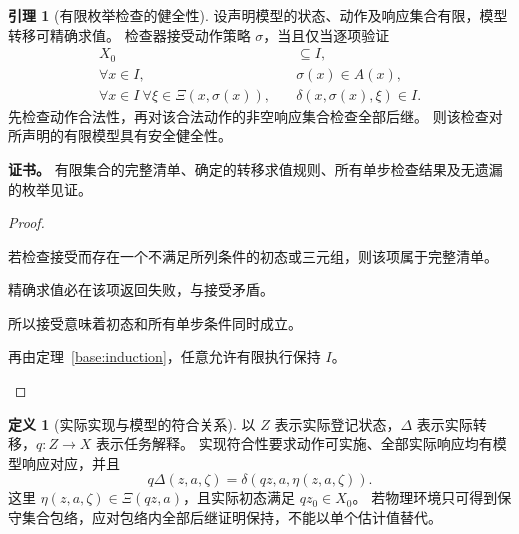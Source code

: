 \documentclass[UTF8,12pt,a4paper,openany,fontset=none,zihao=false]{ctexrep}
\theoremstyle{definition}
\newtheorem{definition}{定义}[chapter]
\newtheorem{lemma}{引理}[chapter]
\newenvironment{certificate}{\par\noindent\textbf{证书。}\ignorespaces}{\par}
\newcommand{\1}{\mathbf 1}
\begin{document}
\begin{lemma}[有限枚举检查的健全性]
\label{tra:finite-check}
设声明模型的状态、动作及响应集合有限，模型转移可精确求值。
检查器接受动作策略 \(\sigma\)，当且仅当逐项验证
\[
\begin{aligned}
X_0&\subseteq I,\\
\forall x\in I,\quad &\sigma(x)\in A(x),\\
\forall x\in I\ \forall\xi\in\Xi(x,\sigma(x)),\quad
&\delta(x,\sigma(x),\xi)\in I.
\end{aligned}
\]
先检查动作合法性，再对该合法动作的非空响应集合检查全部后继。
则该检查对所声明的有限模型具有安全健全性。
\end{lemma}
\begin{certificate}
有限集合的完整清单、确定的转移求值规则、所有单步检查结果及无遗漏的枚举见证。
\end{certificate}
\begin{proof}
\begin{semanticsteps}
\item 若检查接受而存在一个不满足所列条件的初态或三元组，则该项属于完整清单。
\item 精确求值必在该项返回失败，与接受矛盾。
\item 所以接受意味着初态和所有单步条件同时成立。
\item 再由定理~\ref{base:induction}，任意允许有限执行保持 \(I\)。
\end{semanticsteps}
\end{proof}

\begin{definition}[实际实现与模型的符合关系]
\label{tra:realization}
以 \(Z\) 表示实际登记状态，\(\Delta\) 表示实际转移，\(q:Z\to X\) 表示任务解释。
实现符合性要求动作可实施、全部实际响应均有模型响应对应，并且
\[
q\Delta(z,a,\zeta)=\delta(qz,a,\eta(z,a,\zeta)).
\]
这里 \(\eta(z,a,\zeta)\in\Xi(qz,a)\)，且实际初态满足 \(qz_0\in X_0\)。
若物理环境只可得到保守集合包络，应对包络内全部后继证明保持，不能以单个估计值替代。
\end{definition}
\end{document}
